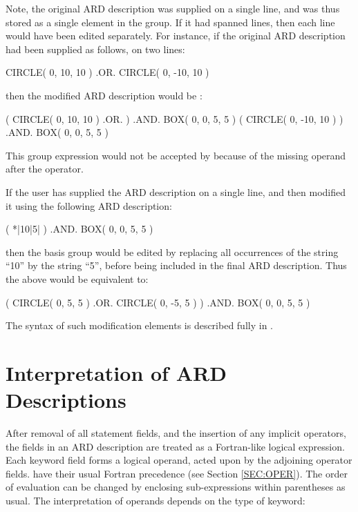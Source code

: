 \documentclass[11pt]{starlink}
\begin{document}
Note, the original ARD description was supplied on a single line, and was
thus stored as a single element in the group. If it had spanned lines,
then each line would have been edited separately. For instance, if the
original ARD description had been supplied as follows, on two lines:

\small
\begin{terminalv}
      CIRCLE( 0, 10, 10 ) .OR.
      CIRCLE( 0, -10, 10 )
\end{terminalv}
\normalsize

then the modified ARD description would be :

\small
\begin{terminalv}
      ( CIRCLE( 0, 10, 10 ) .OR. ) .AND. BOX( 0, 0, 5, 5 )
      ( CIRCLE( 0, -10, 10 ) ) .AND. BOX( 0, 0, 5, 5 )
\end{terminalv}
\normalsize

This group expression would not be accepted by 
because of the missing operand after the  operator.

If the user has supplied the ARD description on a single line, and then
modified it using the following ARD description:

\small
\begin{terminalv}
      ( *|10|5| ) .AND. BOX( 0, 0, 5, 5 )
\end{terminalv}
\normalsize

then the basis group would be edited by replacing all occurrences of the
string ``10'' by the string ``5'', before being included in the final ARD
description. Thus the above would be equivalent to:

\small
\begin{terminalv}
      ( CIRCLE( 0, 5, 5 ) .OR. CIRCLE( 0, -5, 5 ) ) .AND. BOX( 0, 0, 5, 5 )
\end{terminalv}
\normalsize

The syntax of such modification elements is described fully in .

\section{Interpretation of ARD Descriptions}
After removal of all statement fields, and the insertion of any implicit 
operators, the fields in an ARD description are treated as a Fortran-like
logical expression. Each keyword field forms a logical operand, acted upon by
the adjoining operator fields.  have their usual Fortran precedence
(see Section \ref{SEC:OPER}). The order of evaluation can be changed by
enclosing sub-expressions within parentheses as usual. The interpretation of
operands depends on the type of keyword:
\end{document}
